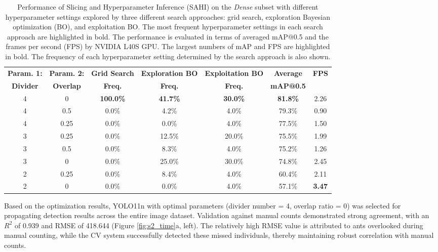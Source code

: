 \begin{table}[H]
    \centering
    \caption{Performance of Slicing and Hyperparameter Inference (SAHI) on the \textit{Dense} subset with different hyperparameter settings explored by three different search approaches: grid search, exploration Bayesian optimization (BO), and exploitation BO. The most frequent hyperparameter settings in each search approach are highlighted in bold. The performance is evaluated in terms of averaged mAP@0.5 and the frames per second (FPS) by NVIDIA L40S GPU. The largest numbers of mAP and FPS are highlighted in bold. The frequency of each hyperparameter setting determined by the search approach is also shown.}
    \label{tab:s2_hpmap}
    \begin{tabular}{ccccccc}
        \midrule
    \textbf{Param. 1:} & \textbf{Param. 2:} & \textbf{Grid Search} & \textbf{Exploration BO} & \textbf{Exploitation BO} & \textbf{Average} & \textbf{FPS} \\
    \textbf{Divider} & \textbf{Overlap} & \textbf{Freq.} & \textbf{Freq.} & \textbf{Freq.} & \textbf{mAP@0.5} & \\
    \midrule
        4 & 0 & \textbf{100.0\%} & \textbf{41.7\%} & \textbf{30.0\%} & \textbf{81.8\%} & 2.26 \\
        4 & 0.5 & 0.0\% & 4.2\% & 4.0\% & 79.3\% & 0.90 \\
        4 & 0.25 & 0.0\% & 0.0\% & 4.0\% & 77.5\% & 1.50 \\
        \midrule
        3 & 0.25 & 0.0\% & 12.5\% & 20.0\% & 75.5\% & 1.99 \\
        3 & 0.5 & 0.0\% & 8.3\% & 4.0\% & 75.2\% & 1.26 \\
        3 & 0 & 0.0\% & 25.0\% & 30.0\% & 74.8\% & 2.45 \\
        \midrule
        2 & 0.25 & 0.0\% & 8.4\% & 4.0\% & 60.4\% & 2.11 \\
        2 & 0 & 0.0\% & 0.0\% & 4.0\% & 57.1\% & \textbf{3.47} \\
        \midrule
    \end{tabular}
\end{table}

Based on the optimization results, YOLO11n with optimal parameters (divider number = 4, overlap ratio = 0) was selected for propagating detection results across the entire image dataset. Validation against manual counts demonstrated strong agreement, with an $R^2$ of 0.939 and RMSE of 418.644 (Figure \ref{fig:s2_time}a, left). The relatively high RMSE value is attributed to ants overlooked during manual counting, while the CV system successfully detected these missed individuals, thereby maintaining robust correlation with manual counts.

